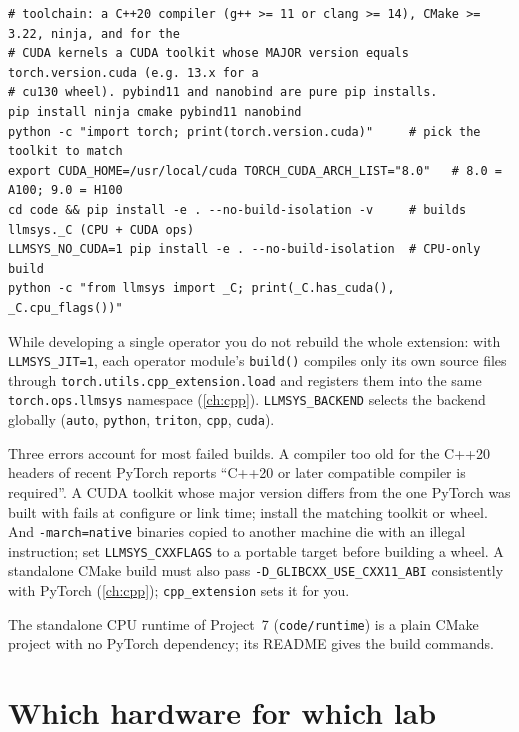\begin{lstlisting}[style=shell]
# toolchain: a C++20 compiler (g++ >= 11 or clang >= 14), CMake >= 3.22, ninja, and for the
# CUDA kernels a CUDA toolkit whose MAJOR version equals torch.version.cuda (e.g. 13.x for a
# cu130 wheel). pybind11 and nanobind are pure pip installs.
pip install ninja cmake pybind11 nanobind
python -c "import torch; print(torch.version.cuda)"     # pick the toolkit to match
export CUDA_HOME=/usr/local/cuda TORCH_CUDA_ARCH_LIST="8.0"   # 8.0 = A100; 9.0 = H100
cd code && pip install -e . --no-build-isolation -v     # builds llmsys._C (CPU + CUDA ops)
LLMSYS_NO_CUDA=1 pip install -e . --no-build-isolation  # CPU-only build
python -c "from llmsys import _C; print(_C.has_cuda(), _C.cpu_flags())"
\end{lstlisting}

While developing a single operator you do not rebuild the whole extension: with
\texttt{LLMSYS\_JIT=1}, each operator module's \texttt{build()} compiles only its own source files
through \texttt{torch.utils.cpp\_extension.load} and registers them into the same
\texttt{torch.ops.llmsys} namespace (\cref{ch:cpp}). \texttt{LLMSYS\_BACKEND} selects the backend
globally (\texttt{auto}, \texttt{python}, \texttt{triton}, \texttt{cpp}, \texttt{cuda}).

\begin{pitfall}
Three errors account for most failed builds. A compiler too old for the C++20 headers of recent
PyTorch reports ``C++20 or later compatible compiler is required''. A CUDA toolkit whose major version
differs from the one PyTorch was built with fails at configure or link time; install the matching
toolkit or wheel. And \texttt{-march=native} binaries copied to another machine die with an illegal
instruction; set \texttt{LLMSYS\_CXXFLAGS} to a portable target before building a wheel. A standalone
CMake build must also pass \texttt{-D\_GLIBCXX\_USE\_CXX11\_ABI} consistently with PyTorch
(\cref{ch:cpp}); \texttt{cpp\_extension} sets it for you.
\end{pitfall}

The standalone CPU runtime of Project~7 (\texttt{code/runtime}) is a plain CMake project with no
PyTorch dependency; its README gives the build commands.

\section{Which hardware for which lab}

